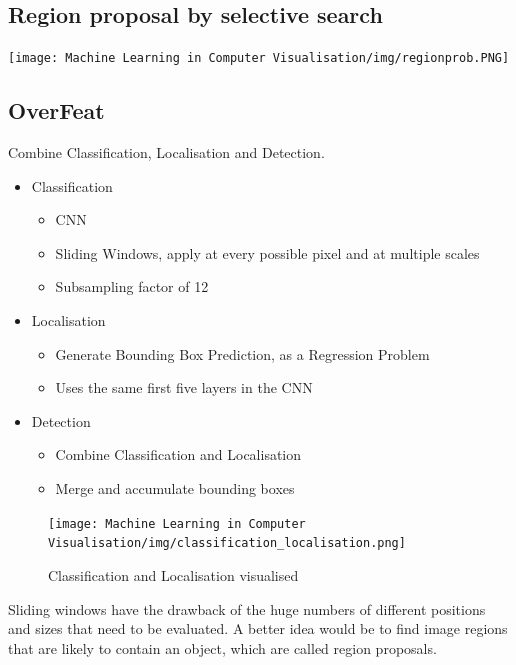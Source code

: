 \documentclass[x11names,11pt,a4paper]{article}
\theoremstyle{definition}
\begin{document}
\subsection{Region proposal by selective search}
\begin{center}
	\texttt{[image: Machine Learning in Computer Visualisation/img/regionprob.PNG]}
\end{center}

\subsection{OverFeat}
Combine Classification, Localisation and Detection.
\begin{itemize}[label=]
	\item Classification
	\begin{itemize}[label=-,nosep]
		\item CNN
		\item Sliding Windows, apply at every possible pixel and at multiple scales
		\item Subsampling factor of 12
	\end{itemize}
	\item Localisation
	\begin{itemize}[label=-,nosep]
		\item Generate Bounding Box Prediction, as a Regression Problem
		\item Uses the same first five layers in the CNN
	\end{itemize}
	\item Detection
	\begin{itemize}[label=-,nosep]
		\item Combine Classification and Localisation
		\item Merge and accumulate bounding boxes
	\end{itemize}
\end{itemize}

\begin{figure}[tbh]
	\centering
	\texttt{[image: Machine Learning in Computer Visualisation/img/classification\_localisation.png]}
	\caption{Classification and Localisation visualised}
	\label{fig:classificationlocalisation}
\end{figure}

Sliding windows have the drawback of the huge numbers of different positions and sizes that need to be evaluated. A better idea would be to find image regions that are likely to contain an object, which are called region proposals.
\end{document}
